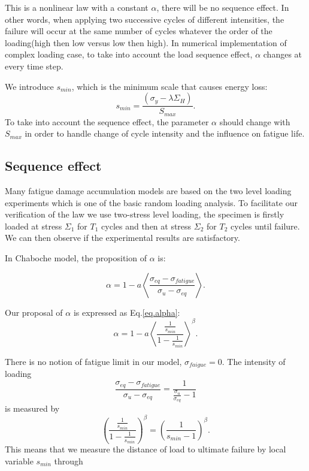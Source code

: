 \documentclass[3p,times,number,review]{elsarticle}
\begin{document}
This is a nonlinear law with a constant $\alpha$, there will be no sequence effect. In other words,
when applying two successive cycles of different intensities, the failure will occur at the same number of cycles whatever the order of the loading(high then low versus low then high). In numerical implementation of complex loading case, to take into account the load sequence effect, $\alpha$ changes at every time step.

We introduce $s_{min}$, which is the minimum scale that causes energy loss:
$$s_{min}=\dfrac{\left(\sigma_y-\lambda \Sigma_H\right)}{S_{max}}.$$
To take into account the sequence effect, the parameter $\alpha$ should change with $S_{max}$ in order to handle change of cycle intensity and the influence on fatigue life.

\subsection{Sequence effect}

Many fatigue damage accumulation models are based on the two level loading experiments which is one of the basic random loading analysis. To facilitate our verification of the law we use two-stress level loading, the specimen is firstly loaded at stress $\Sigma_1$ for $T_1$ cycles and then at stress $\Sigma_2$ for $T_2$ cycles until failure. We can then observe if the experimental results are satisfactory.

In Chaboche model, the proposition of $\alpha$ is:

\begin{equation}
\alpha = 1 - a\left\langle \frac{ \sigma_{eq}-\sigma_{fatigue}}{ \sigma_{u} - \sigma_{eq}}\right\rangle.
\end{equation}

Our proposal of $\alpha$ is expressed as Eq.\eqref{eq.alpha}:
\begin{equation}
\alpha=1-a\left\langle \dfrac{\frac{1}{s_{min}}}{1-\frac{1}{s_{min}}} \right\rangle^\beta .
\label{eq.alpha}
\end{equation}

There is no notion of fatigue limit in our model, $\sigma_{faigue}=0$. The intensity of loading
 $$\frac{ \sigma_{eq}-\sigma_{fatigue}}{ \sigma_{u} - \sigma_{eq}}= \frac{ 1}{\frac{\sigma_{u}}{\sigma_{eq}} -1}$$
 is measured by 
$$\left( \dfrac{\frac{1}{s_{min}}}{1-\frac{1}{s_{min}}}\right) ^\beta=\left(\dfrac{1}{s_{min}-1} \right) ^\beta.$$
This means that we measure the distance of load to ultimate failure by local variable $s_{min}$ through 
\end{document}
